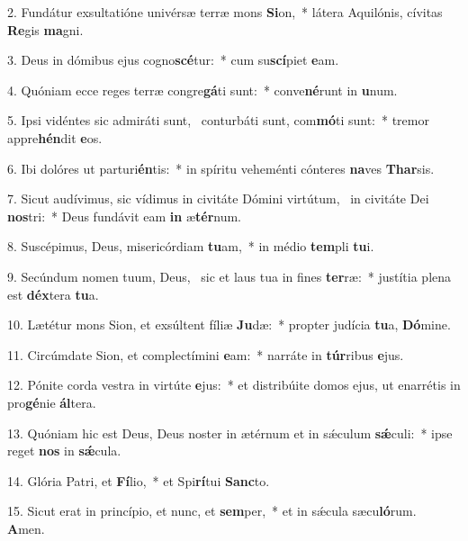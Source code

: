 2. Fundátur exsultatióne univérsæ terræ mons \textbf{Si}on,~*  látera Aquilónis, cívitas \textbf{Re}gis \textbf{ma}gni.\

3. Deus in dómibus ejus cogno\textbf{scé}tur:~*  cum su\textbf{scí}piet \textbf{e}am.\

4. Quóniam ecce reges terræ congre\textbf{gá}ti sunt:~*  conve\textbf{né}runt in \textbf{u}num.\

5. Ipsi vidéntes sic admiráti sunt, \dag\  conturbáti sunt, com\textbf{mó}ti sunt:~*  tremor appre\textbf{hén}dit \textbf{e}os.\

6. Ibi dolóres ut parturi\textbf{én}tis:~*  in spíritu veheménti cónteres \textbf{na}ves \textbf{Thar}sis.\

7. Sicut audívimus, sic vídimus in civitáte Dómini virtútum, \dag\  in civitáte Dei \textbf{nos}tri:~*  Deus fundávit eam \textbf{in} æ\textbf{tér}num.\

8. Suscépimus, Deus, misericórdiam \textbf{tu}am,~*  in médio \textbf{tem}pli \textbf{tu}i.\

9. Secúndum nomen tuum, Deus, \dag\  sic et laus tua in fines \textbf{ter}ræ:~*  justítia plena est \textbf{déx}tera \textbf{tu}a.\

10. Lætétur mons Sion, et exsúltent fíliæ \textbf{Ju}dæ:~*  propter judícia \textbf{tu}a, \textbf{Dó}mine.\

11. Circúmdate Sion, et complectímini \textbf{e}am:~*  narráte in \textbf{túr}ribus \textbf{e}jus.\

12. Pónite corda vestra in virtúte \textbf{e}jus:~*  et distribúite domos ejus, ut enarrétis in pro\textbf{gé}nie \textbf{ál}tera.\

13. Quóniam hic est Deus, Deus noster in ætérnum et in sǽculum \textbf{sǽ}culi:~*  ipse reget \textbf{nos} in \textbf{sǽ}cula.\

14. Glória Patri, et \textbf{Fí}lio,~*  et Spi\textbf{rí}tui \textbf{Sanc}to.\

15. Sicut erat in princípio, et nunc, et \textbf{sem}per,~*  et in sǽcula sæcu\textbf{ló}rum. \textbf{A}men.\

